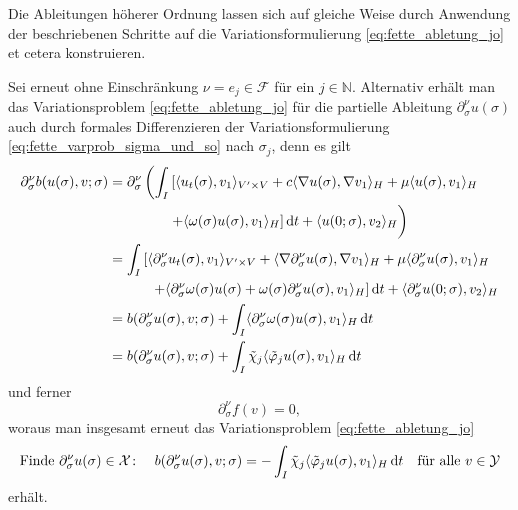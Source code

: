 \begin{Satz}
\begin{Beweis}
        Die Ableitungen höherer Ordnung lassen sich auf gleiche Weise durch Anwendung der beschriebenen Schritte auf die Variationsformulierung \cref{eq:fette_abletung_jo} et cetera konstruieren.
    \end{Beweis}
\end{Satz}

\begin{Bemerkung}
    Sei erneut ohne Einschränkung $\nu = e_{j} \in \mathcal{F}$ für ein $j \in \mathbb{N}$.
    Alternativ erhält man das Variationsproblem \cref{eq:fette_abletung_jo} für die partielle Ableitung $\partial^{\nu}_{\sigma} u(\sigma)$ auch durch formales Differenzieren der Variationsformulierung \cref{eq:fette_varprob_sigma_und_so} nach $\sigma_{j}$, denn es gilt
    \begin{align}
        \partial^{\nu}_{\sigma} b(u(\sigma), v; \sigma)
        &= \partial^{\nu}_{\sigma} \left( \int_{I} \left[ \skp{u_{t}(\sigma)}{v_{1}}{V' \times V} + c \skp{\grad u(\sigma)}{\grad v_{1}}{H} + \mu \skp{u(\sigma)}{v_{1}}{H} \right.\right.
        \\&\qquad\qquad \left.\vphantom{\int_{I}}\left. + \skp{\omega(\sigma) u(\sigma)}{v_{1}}{H} \right] \diff t + \skp{u(0; \sigma)}{v_{2}}{H} \right)
        \\&= \int_{I} \left[ \skp{\partial^{\nu}_{\sigma} u_{t}(\sigma)}{v_{1}}{V' \times V}
            + \skp{\grad \partial^{\nu}_{\sigma} u(\sigma)}{\grad v_{1}}{H} + \mu \skp{\partial^{\nu}_{\sigma} u(\sigma)}{v_{1}}{H} \right.
        \\&\qquad \quad \left.+ \skp{\partial^{\nu}_{\sigma} \omega(\sigma) u(\sigma) + \omega(\sigma) \partial^{\nu}_{\sigma} u(\sigma)}{v_{1}}{H} \right] \diff t + \skp{\partial^{\nu}_{\sigma} u(0; \sigma)}{v_{2}}{H}
        \\&= b(\partial^{\nu}_{\sigma} u(\sigma), v; \sigma) + \int_{I} \skp{\partial^{\nu}_{\sigma} \omega(\sigma) u(\sigma)}{v_{1}}{H} \diff t
        \\&= b(\partial^{\nu}_{\sigma} u(\sigma), v; \sigma) + \int_{I} \tilde{\chi}_{j} \skp{\tilde{\varphi}_{j} u(\sigma)}{v_{1}}{H} \diff t
    \end{align}
    und ferner
    \begin{equation}
        \partial^{\nu}_{\sigma} f(v) = 0,
    \end{equation}
    woraus man insgesamt erneut das Variationsproblem \cref{eq:fette_abletung_jo}
    \begin{equation}
        \text{Finde}~\partial^{\nu}_{\sigma} u(\sigma) \in \mathcal X \colon \quad b(\partial^{\nu}_{\sigma} u(\sigma), v; \sigma) = - \int_{I} \tilde{\chi}_{j} \skp{\tilde{\varphi}_{j}  u(\sigma)}{v_{1}}{H} \diff t \quad \fa v \in \mathcal Y
    \end{equation}
    erhält.
\end{Bemerkung}

